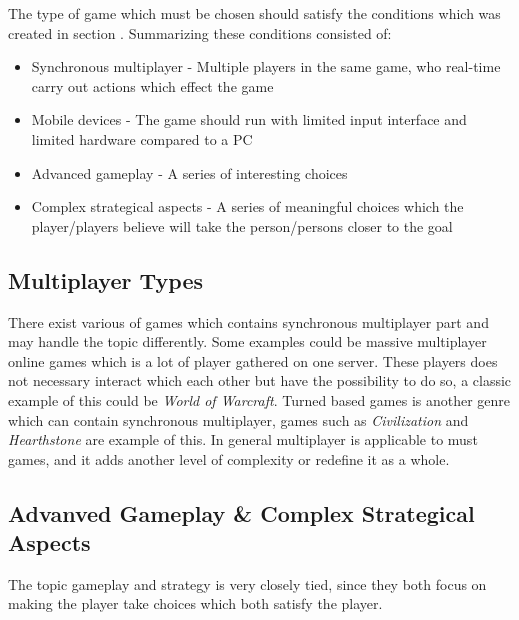 The type of game which must be chosen should satisfy the conditions which was created in section \cite{sec:specifyingtheproblemstatement}.
Summarizing these conditions consisted of:
\begin{itemize}
\item Synchronous multiplayer - Multiple players in the same game, who real-time carry out actions which effect the game
\item Mobile devices - The game should run with limited input interface and limited hardware compared to a PC
\item Advanced gameplay - A series of interesting choices
\item Complex strategical aspects - A series of meaningful choices which the player/players believe will take the person/persons closer to the goal
\end{itemize}

\subsection{Multiplayer Types}
There exist various of games which contains synchronous multiplayer part and may handle the topic differently. Some examples could be massive multiplayer online games which is a lot of player gathered on one server. These players does not necessary interact which each other but have the possibility to do so, a classic example of this could be \textit{World of Warcraft}\cite{wow}. Turned based games is another genre which can contain synchronous multiplayer, games such as \textit{Civilization} and \textit{Hearthstone}\cite{hearthstone} are example of this. In general multiplayer is applicable to must games, and it adds another level of complexity or redefine it as a whole.

\subsection{Advanved Gameplay \& Complex Strategical Aspects}
The topic gameplay and strategy is very closely tied, since they both focus on making the player take choices which both satisfy the player.

